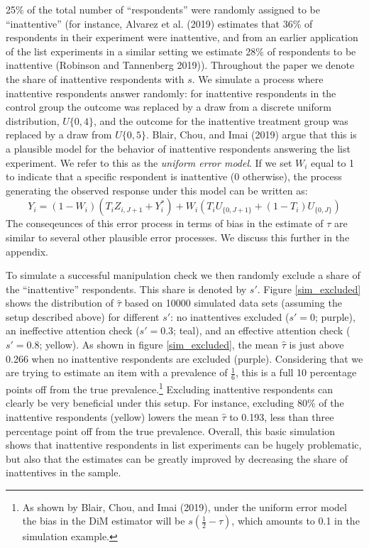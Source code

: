 \documentclass[]{article}
\let\rmarkdownfootnote\footnote%
\def\footnote{\protect\rmarkdownfootnote}
\begin{document}
25\% of the total number of ``respondents'' were randomly assigned to be
``inattentive'' (for instance, Alvarez et al. (2019) estimates that 36\%
of respondents in their experiment were inattentive, and from an earlier
application of the list experiments in a similar setting we estimate
28\% of respondents to be inattentive (Robinson and Tannenberg 2019)).
Throughout the paper we denote the share of inattentive respondents with
\(s\). We simulate a process where inattentive respondents answer
randomly: for inattentive respondents in the control group the outcome
was replaced by a draw from a discrete uniform distribution,
\(U\{0,4\}\), and the outcome for the inattentive treatment group was
replaced by a draw from \(U\{0,5\}\). Blair, Chou, and Imai (2019) argue
that this is a plausible model for the behavior of inattentive
respondents answering the list experiment. We refer to this as the
\emph{uniform error model}. If we set \(W_{i}\) equal to 1 to indicate
that a specific respondent is inattentive (0 otherwise), the process
generating the observed response under this model can be written as: \[
Y_{i} = (1-W_{i})(T_{i}Z_{i, J+1}+Y^*_{i})+W_{i}(T_{i}U_{\{0,J+1\}}+(1-T_{i})U_{\{0,J\}})
\] The conseqeunces of this error process in terms of bias in the
estimate of \(\tau\) are similar to several other plausible error
processes. We discuss this further in the appendix.

To simulate a successful manipulation check we then randomly exclude a
share of the ``inattentive'' respondents. This share is denoted by
\(s'\). Figure \ref{sim_excluded} shows the distribution of
\(\hat{\tau}\) based on 10000 simulated data sets (assuming the setup
described above) for different \(s'\): no inattentives excluded
(\(s'=0\); purple), an ineffective attention check (\(s'=0.3\); teal),
and an effective attention check (\(s'=0.8\); yellow). As shown in
figure \ref{sim_excluded}, the mean \(\hat{\tau}\) is just above 0.266
when no inattentive respondents are excluded (purple). Considering that
we are trying to estimate an item with a prevalence of \(\frac{1}{6}\),
this is a full 10 percentage points off from the true
prevalence.\footnote{As shown by Blair, Chou, and Imai (2019), under the
  uniform error model the bias in the DiM estimator will be
  \(s \left(\frac{1}{2} - \tau \right)\), which amounts to 0.1 in the
  simulation example.} Excluding inattentive respondents can clearly be
very beneficial under this setup. For instance, excluding 80\% of the
inattentive respondents (yellow) lowers the mean \(\hat{\tau}\) to
0.193, less than three percentage point off from the true prevalence.
Overall, this basic simulation shows that inattentive respondents in
list experiments can be hugely problematic, but also that the estimates
can be greatly improved by decreasing the share of inattentives in the
sample.
\end{document}
